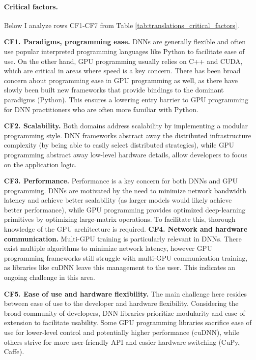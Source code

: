 \paragraph{Critical factors.}
Below I analyze rows CF1-CF7 from Table \ref{tab:translations_critical_factors}.

\textbf{CF1. Paradigms, programming ease.}
DNNs are generally flexible and often use popular interpreted programming languages like Python to facilitate
ease of use.
On the other hand, GPU programming usually relies on C++ and CUDA, which are critical in areas
where speed is a key concern. There has been broad concern about programming ease in GPU programming
as well, as there have slowly been built new frameworks that provide bindings to the dominant paradigms
(Python). This ensures a lowering entry barrier to GPU programming for DNN practitioners who are
often more familiar with Python.

\textbf{CF2. Scalability.}
Both domains address scalability by implementing a modular programming style. DNN frameworks abstract away
the distributed infrastructure complexity (by being able to easily select distributed strategies), while
GPU programming abstract away low-level hardware details, allow developers to focus on the application logic.

\textbf{CF3. Performance.}
Performance is a key concern for both DNNs and GPU programming. DNNs are
motivated by the need to minimize network bandwidth latency and achieve better scalability (as larger
models would likely achieve better performance), while GPU programming provides optimized deep-learning
primitives by optimizing large-matrix operations. To facilitate this, thorough knowledge of the GPU
architecture is required.
\textbf{CF4. Network and hardware communication.}
Multi-GPU training is particularly relevant in DNNs. There exist multiple algorithms to minimize
network latency, however GPU programming frameworks still struggle with multi-GPU communication
training, as libraries like cuDNN leave this management to the user. This indicates an ongoing challenge
in this area.

\textbf{CF5. Ease of use and hardware flexibility.}
The main challenge here resides between ease of use to the developer and hardware flexibility.
Considering the broad community of developers, DNN libraries prioritize modularity and ease of
extension to facilitate usability. Some GPU programming libraries sacrifice ease of use for lower-level control
and potentially higher performance (cuDNN), while others strive for more user-friendly API and easier
hardware switching (CuPy, Caffe).
